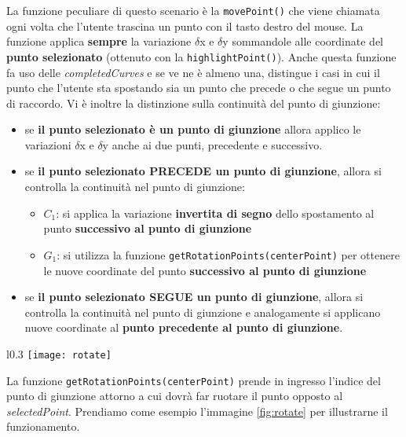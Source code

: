 La funzione peculiare di questo scenario è la \texttt{movePoint()} che viene chiamata ogni volta che l'utente trascina un punto con il tasto destro del mouse. La funzione applica \textbf{sempre} la variazione $\delta$x e $\delta$y sommandole alle coordinate del \textbf{punto selezionato} (ottenuto con la \texttt{highlightPoint()}). Anche questa funzione fa uso delle \textit{completedCurves} e se ve ne è almeno una, distingue i casi in cui il punto che l'utente sta spostando sia un punto che precede o che segue un punto di raccordo. Vi è inoltre la distinzione sulla continuità del punto di giunzione:
\begin{itemize}
  \item se \textbf{il punto selezionato è un punto di giunzione} allora applico le variazioni $\delta$x e $\delta$y anche ai due punti, precedente e successivo.
  \item se \textbf{il punto selezionato PRECEDE un punto di giunzione}, allora si controlla la continuità nel punto di giunzione:
  	\begin{itemize}
  		\item \textbf{$C_1$}: si applica la variazione \textbf{invertita di segno} dello spostamento al punto \textbf{successivo al punto di giunzione}
  		\item \textbf{$G_1$}: si utilizza la funzione \texttt{getRotationPoints(centerPoint)} per ottenere le nuove coordinate del punto \textbf{successivo al punto di giunzione}
  	\end{itemize}
  \item se \textbf{il punto selezionato SEGUE un punto di giunzione}, allora si controlla la continuità nel punto di giunzione e analogamente si applicano nuove coordinate al \textbf{punto precedente al punto di giunzione}.
\end{itemize}


\begin{wrapfigure}{l}{0.3\textwidth} %
    \centering
    \vspace{-0.3cm}
    \texttt{[image: rotate]}
    \caption{\label{fig:rotate}}
\end{wrapfigure}

\newpage %

La funzione \texttt{getRotationPoints(centerPoint)} prende in ingresso l'indice del punto di giunzione attorno a cui dovrà far ruotare il punto opposto al \textit{selectedPoint}. Prendiamo come esempio l'immagine \ref{fig:rotate} per illustrarne il funzionamento.\\

